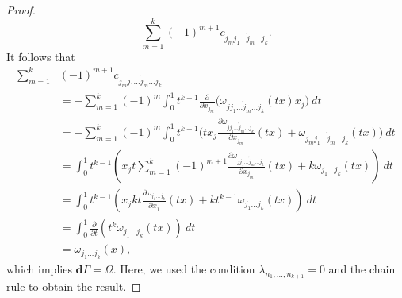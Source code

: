 \begin{proof}
\begin{equation*}
	\sum_{m=1}^{k} (-1)^{m+1} c_{j_mj_1\dots\mathring j_{m}\dots j_k}.
\end{equation*}
It follows that
\begin{equation*}
\begin{aligned}
\sum_{m=1}^{k} &(-1)^{m+1} c_{j_mj_1\dots\mathring j_{m}\dots j_k} \\
	& = -\sum_{m=1}^k (-1)^m \int_0^1 t^{k-1} \frac{\partial}{\partial x_{j_m}}\big( \omega_{jj_1\dots\mathring j_m\dots j_k}(tx) x_j \big)\ dt \\
	& = -\sum_{m=1}^k (-1)^m \int_0^1 t^{k-1} \big( tx_j\frac{\partial \omega_{jj_1\dots\mathring j_m\dots j_k} }{\partial x_{j_m}}(tx) + \omega_{j_mj_1\dots\mathring j_m\dots j_k}(tx)  \big)\ dt \\
       & = \int_0^1 t^{k-1} \left( x_j t \sum_{m=1}^{k} (-1)^{m+1}\frac{\partial \omega_{jj_1\dots\mathring j_m\dots j_k}}{\partial x_{j_m}}(tx) + k \omega_{j_1\dots j_k}(tx)  \right) \ dt \\
       & = \int_0^1 t^{k-1} \left( x_j k t \frac{\partial \omega_{j_1\dots j_k}}{\partial x_j}(tx) + kt^{k-1} \omega_{j_1\dots j_k}(tx)\right)\ dt \\
       & = \int_0^1 \frac{\partial}{\partial t}(t^k \omega_{j_1\dots j_k}(tx) )\ dt \\
      	& = \omega_{j_1\dots j_k}(x),
\end{aligned}
\end{equation*}
which implies $\mathbf d \Gamma = \Omega$. Here, we used the condition $\lambda_{n_1,\dots,n_{k+1}} = 0$ and the chain rule to obtain the result.
\end{proof}


